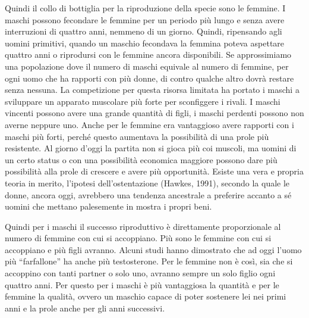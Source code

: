\documentclass[12pt]{book} %
\begin{document}
Quindi il collo di bottiglia per la riproduzione della specie sono le femmine. I maschi possono fecondare le femmine per
un periodo più lungo e senza avere interruzioni di quattro anni, nemmeno di un giorno. Quindi, ripensando agli uomini
primitivi, quando un maschio fecondava la femmina poteva aspettare quattro anni o riprodursi con le femmine ancora
disponibili. Se approssimiamo una popolazione dove il numero di maschi equivale al numero di femmine, per ogni uomo che
ha rapporti con più donne, di contro qualche altro dovrà restare senza nessuna. La competizione per questa risorsa
limitata ha portato i maschi a sviluppare un apparato muscolare più forte per sconfiggere i rivali. I maschi vincenti
possono avere una grande quantità di figli, i maschi perdenti possono non averne neppure uno. Anche per le femmine era
vantaggioso avere rapporti con i maschi più forti, perché questo aumentava la possibilità di una prole più resistente.
Al giorno d'oggi la partita non si gioca più coi muscoli, ma uomini di un certo status o con una
possibilità economica maggiore possono dare più possibilità alla prole di crescere e avere più opportunità. Esiste una
vera e propria teoria in merito, l'ipotesi dell'ostentazione (Hawkes, 1991),
secondo la quale le donne, ancora oggi, avrebbero una tendenza ancestrale a preferire accanto a sé uomini che mettano
palesemente in mostra i propri beni. 

Quindi per i maschi il successo riproduttivo è direttamente proporzionale al numero di femmine con cui si accoppiano.
Più sono le femmine con cui si accoppiano e più figli avranno. Alcuni studi hanno dimostrato che ad oggi l'uomo più
“farfallone” ha anche più testosterone. Per le femmine non è così, sia che si accoppino con tanti partner o solo uno,
avranno sempre un solo figlio ogni quattro anni. Per questo per i maschi è più vantaggiosa la quantità e per le femmine
la qualità, ovvero un maschio capace di poter sostenere lei nei primi anni e la prole anche per gli anni successivi.
\end{document}
